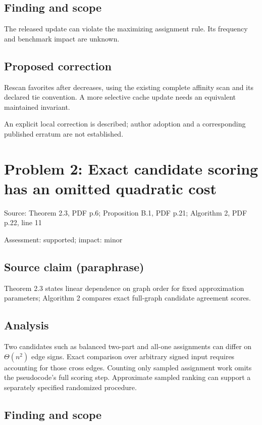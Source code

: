 \documentclass[11pt]{article}
\begin{document}
\subsection*{Finding and scope}

The released update can violate the maximizing assignment rule. Its frequency and benchmark impact are unknown.

\subsection*{Proposed correction}

Rescan favorites after decreases, using the existing complete affinity scan and its declared tie convention. A more selective cache update needs an equivalent maintained invariant.

An explicit local correction is described; author adoption and a corresponding published erratum are not established.

\section*{Problem 2: Exact candidate scoring has an omitted quadratic cost}

Source: Theorem 2.3, PDF p.6; Proposition B.1, PDF p.21; Algorithm 2, PDF p.22, line 11

Assessment: supported; impact: minor

\subsection*{Source claim (paraphrase)}

Theorem 2.3 states linear dependence on graph order for fixed approximation parameters; Algorithm 2 compares exact full-graph candidate agreement scores.

\subsection*{Analysis}

Two candidates such as balanced two-part and all-one assignments can differ on \(\Theta(n^2)\) edge signs. Exact comparison over arbitrary signed input requires accounting for those cross edges. Counting only sampled assignment work omits the pseudocode’s full scoring step. Approximate sampled ranking can support a separately specified randomized procedure.

\subsection*{Finding and scope}
\end{document}
